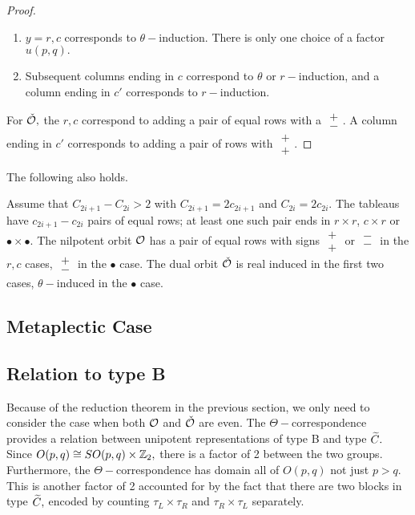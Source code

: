 \documentclass[11pt ,reqno]{amsart}
\begin{document}
\begin{proof}
\begin{enumerate}
\item $y=r,c$ corresponds to $\theta-$induction. There is only one
  choice of a factor $u(p,q).$ 
\item Subsequent
  columns ending in $c$ correspond to $\theta$ or $r-$induction, and a
  column ending in $c'$ corresponds to    $r-$induction.  
\end{enumerate}
For ${\check {\mathcal O}},$  the $r,c$ correspond to adding a
  pair of equal rows with a $
  \begin{matrix}
    +\\ -
  \end{matrix}
$. A column ending in $c'$ corresponds
  to adding a pair of rows with $
  \begin{matrix}
    +\\ +
  \end{matrix}
.$
\end{proof}
The following also holds.
\begin{theorem}  [Type C]\label{t:reduction}

Assume that $C_{2i+1}-C_{2i}>2$ with $C_{2i+1}=2c_{2i+1}$ and
$C_{2i}=2c_{2i}.$ The tableaus have $c_{2i+1}-c_{2i}$  pairs of equal
rows; at least one such pair  ends in $r\times r$, $c\times r$ or
$\bullet\times\bullet.$ The nilpotent orbit $\mathcal O$ has a pair of equal rows with signs $
\begin{matrix}
  +\\ +
\end{matrix}
$ or $\begin{matrix}
  -\\ -
\end{matrix}$
in the $r,c$ cases, $\begin{matrix}
  +\\ -
\end{matrix}$ in the $\bullet$ case. The dual orbit ${\check {\mathcal O}}$
is real induced in the first two cases, $\theta-$induced in the
$\bullet$ case. 
\end{theorem}






  \subsection{Metaplectic Case}
  \subsection{Relation to type B}
Because of the reduction theorem in
the previous section, we only need to consider the case when both
$\mathcal O$ and ${\check {\mathcal O}}$ are even. The $\Theta-$correspondence provides a
relation between unipotent representations of type B and type ${\widetilde C}.$ Since $O(p,q)\cong SO(p,q)\times{\mathbb Z}_2,$ there is a factor of 2
between the two groups. Furthermore, the $\Theta-$correspondence has
domain all of $O(p,q)$ not just $p>q.$ This is another factor of 2
accounted for by the fact that there are two blocks in type ${\widetilde C},$
encoded by counting $\tau_L\times\tau_R$ and $\tau_R\times\tau_L$
separately. 
\end{document}

